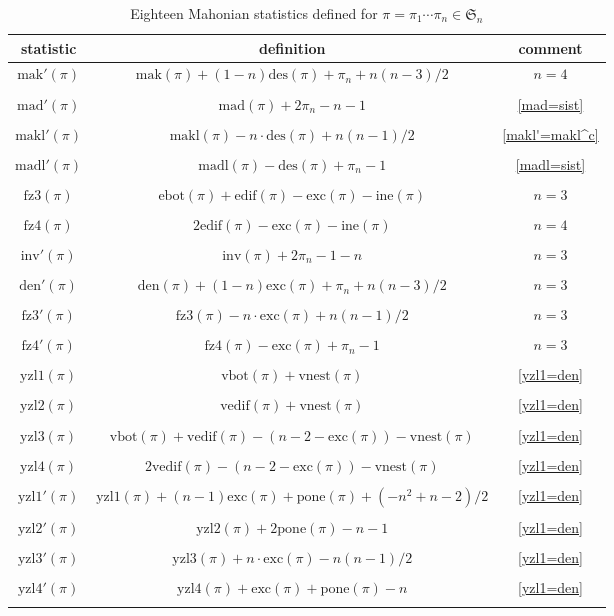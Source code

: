 \documentclass[12pt]{amsart}
\numberwithin{equation}{section}
\theoremstyle{plain}
\theoremstyle{definition}
\def\SS{\mathfrak{S}}
\def\des{\mathrm{des}}
\def\edif{\mathrm{edif}}
\def\ine{\mathrm{ine}}
\def\exc{\mathrm{exc}}
\def\ebot{\mathrm{ebot}}
\def\vbot{\mathrm{vbot}}
\def\vedif{\mathrm{vedif}}
\def\pone{\mathrm{pone}}
\def\vnest{\mathrm{vnest}}
\def\inv{\mathrm{inv}}
\def\den{\mathrm{den}}
\def\mak{\mathrm{mak}}
\def\mad{\mathrm{mad}}
\def\mak{\mathrm{mak}}
\def\inv{\mathrm{inv}}
\def\makl{\mathrm{makl}}
\def\madl{\mathrm{madl}}
\def\fzthree{\mathrm{fz3}}
\def\fzfour{\mathrm{fz4}}
\def\yzlone{\mathrm{yzl1}}
\def\yzltwo{\mathrm{yzl2}}
\def\yzlthree{\mathrm{yzl3}}
\def\yzlfour{\mathrm{yzl4}}
\begin{document}
\begin{table}
{\small
\begin{tabular*}{5in}{ccc}
\toprule
statistic & definition & comment\\
\midrule
$\mak'(\pi)$ & $\mak(\pi)+(1-n)\des(\pi)+\pi_n+n(n-3)/2$ & $n=4$\\
&&\\
$\mad'(\pi)$ & $\mad(\pi)+2\pi_n-n-1$ & \eqref{mad=sist}\\
&&\\
$\makl'(\pi)$ & $\makl(\pi)-n\cdot\des(\pi)+n(n-1)/2$ & \eqref{makl'=makl^c}\\
&&\\
$\madl'(\pi)$ & $\madl(\pi)-\des(\pi)+\pi_n-1$ & \eqref{madl=sist}\\
&&\\
$\fzthree(\pi)$ & $\ebot(\pi)+\edif(\pi)-\exc(\pi)-\ine(\pi)$ & $n=3$\\
&&\\
$\fzfour(\pi)$ & $2\edif(\pi)-\exc(\pi)-\ine(\pi)$ & $n=4$\\
&&\\
$\inv'(\pi)$ & $\inv(\pi)+2\pi_n-1-n$ & $n=3$\\
&&\\
$\den'(\pi)$ & $\den(\pi)+(1-n)\exc(\pi)+\pi_n+n(n-3)/2$ & $n=3$\\
&&\\
$\fzthree'(\pi)$ & $\fzthree(\pi)-n\cdot\exc(\pi)+n(n-1)/2$ & $n=3$\\
&&\\
$\fzfour'(\pi)$ & $\fzfour(\pi) -\exc(\pi) +\pi_n-1$ & $n=3$\\
&&\\
$\yzlone(\pi)$ & $\vbot(\pi) +\vnest(\pi)$ & \eqref{yzl1=den}\\
&&\\
$\yzltwo(\pi)$ & $\vedif(\pi) +\vnest(\pi)$ & \eqref{yzl1=den}\\
&&\\
$\yzlthree(\pi)$ & $\vbot(\pi)+\vedif(\pi)-(n-2-\exc(\pi))-\vnest(\pi)$ & \eqref{yzl1=den}\\
&&\\
$\yzlfour(\pi)$ & $2\vedif(\pi)-(n-2-\exc(\pi))-\vnest(\pi)$ & \eqref{yzl1=den}\\
&&\\
$\yzlone'(\pi)$ & $\yzlone(\pi)+(n-1)\exc(\pi)+\pone(\pi)+(-n^2+n-2)/2$ & \eqref{yzl1=den}\\
&&\\
$\yzltwo'(\pi)$ & $\yzltwo(\pi)+2\pone(\pi)-n-1$ & \eqref{yzl1=den}\\
&&\\
$\yzlthree'(\pi)$ & $\yzlthree(\pi)+n\cdot\exc(\pi)-n(n-1)/2$ & \eqref{yzl1=den}\\
&&\\
$\yzlfour'(\pi)$ & $\yzlfour(\pi)+\exc(\pi)+\pone(\pi)-n$ & \eqref{yzl1=den}\\
\bottomrule\\
\end{tabular*}
}
\caption{Eighteen Mahonian statistics defined for $\pi=\pi_1\cdots\pi_n\in\SS_n$}\label{Mahonian stats}
\end{table}
\end{document}
